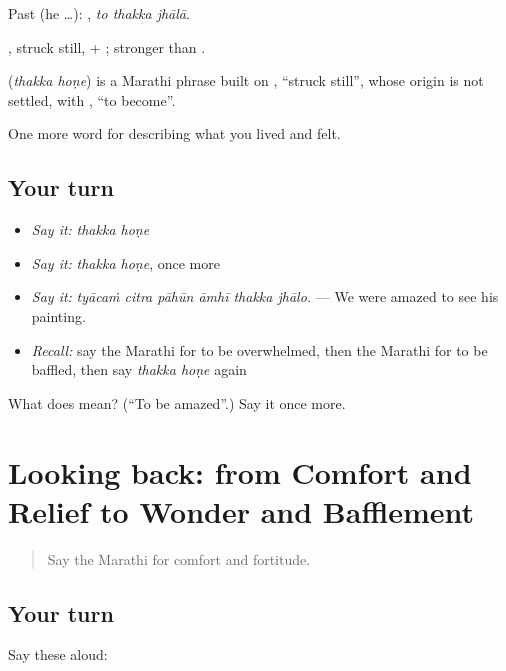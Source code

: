 Past (he …):   , \emph{to thakka jhālā}.

, struck still, + ; stronger than  .

\begin{cousinweb}
\textbf{ } (\emph{thakka hoṇe}) is a Marathi phrase built on , \textquotedblleft{}struck still\textquotedblright{}, whose origin is not settled, with , \textquotedblleft{}to become\textquotedblright{}.
\end{cousinweb}

\begin{grammarlens}[title={What you've built}]
One more word for describing what you lived and felt.
\end{grammarlens}

\subsection*{Your turn}
\begin{itemize}
\raggedright
  \item \emph{Say it:} \emph{thakka hoṇe}
  \item \emph{Say it:} \emph{thakka hoṇe}, once more
  \item \emph{Say it:} \emph{tyācaṁ citra pāhūn āmhī thakka jhālo.} — We were amazed to see his painting.
  \item \emph{Recall:} say the Marathi for to be overwhelmed, then the Marathi for to be baffled, then say \emph{thakka hoṇe} again
\end{itemize}

\begin{tcolorbox}[breakable,colback=teal!4,colframe=teal!35!black,title={Before you move on}]
What does   mean? (\textquotedblleft{}To be amazed\textquotedblright{}.) Say it once more.
\end{tcolorbox}
\section[(dialogue)]{Looking back: from Comfort and Relief to Wonder and Bafflement}

\label{lesson:MR-R465-review-458-465}



\begin{quote}
Say the Marathi for comfort and fortitude.
\end{quote}

\subsection*{Your turn}
Say these aloud:

